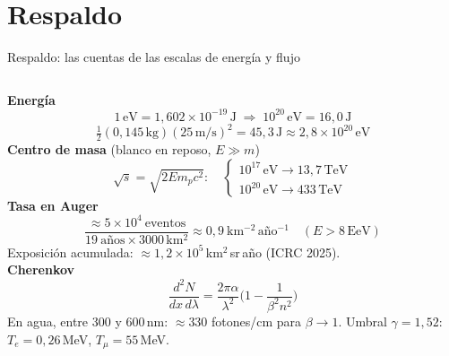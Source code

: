 \section{Respaldo}

\begin{frame}[plain]
\end{frame}

\begin{frame}{Respaldo: las cuentas de las escalas de energía y flujo}
  \begin{columns}[T,onlytextwidth]
      \small
      \textbf{Energía}
      \[ 1\,\mathrm{eV}=1{,}602\times10^{-19}\,\mathrm{J}
         \;\Rightarrow\; 10^{20}\,\mathrm{eV}=16{,}0\,\mathrm{J} \]
      \[ \tfrac12(0{,}145\,\mathrm{kg})(25\,\mathrm{m/s})^2=45{,}3\,\mathrm{J}
         \approx 2{,}8\times10^{20}\,\mathrm{eV} \]
      \textbf{Centro de masa} (blanco en reposo, $E\gg m$)
      \[ \sqrt{s}=\sqrt{2Em_pc^2}:\quad
         \begin{cases}10^{17}\,\mathrm{eV}\to 13{,}7\,\mathrm{TeV}\\
         10^{20}\,\mathrm{eV}\to 433\,\mathrm{TeV}\end{cases} \]
      \small
      \textbf{Tasa en Auger}
      \[ \frac{\approx5\times10^4\ \text{eventos}}{19\ \text{años}\times3000\,\mathrm{km^2}}
         \approx 0{,}9\ \mathrm{km^{-2}\,año^{-1}}\quad(E>8\,\mathrm{EeV}) \]
      Exposición acumulada: $\approx1{,}2\times10^{5}$\,km$^2$\,sr\,año (ICRC 2025).\\[6pt]
      \textbf{Cherenkov}
      \[ \frac{d^2N}{dx\,d\lambda}=\frac{2\pi\alpha}{\lambda^2}
         \Big(1-\frac{1}{\beta^2n^2}\Big) \]
      {\footnotesize En agua, entre 300 y 600\,nm: $\approx330$ fotones/cm para
      $\beta\to1$. Umbral $\gamma=1{,}52$: $T_e=0{,}26$\,MeV, $T_\mu=55$\,MeV.}
  \end{columns}
\end{frame}

